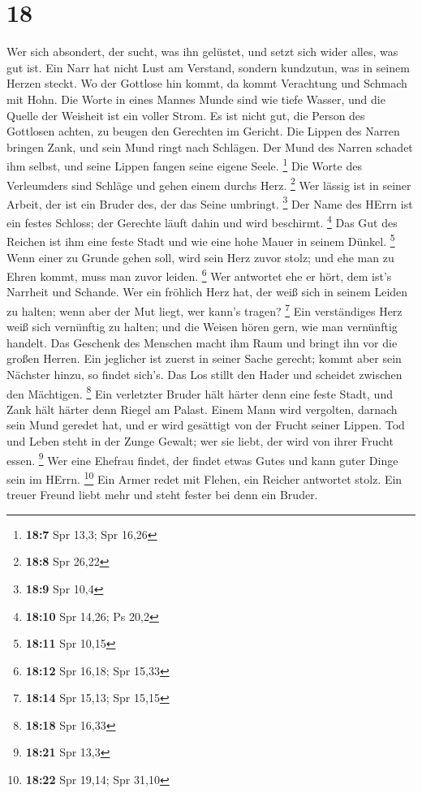 \hypertarget{section-17}{%
\section{18}\label{section-17}}

 Wer sich absondert, der sucht, was ihn gelüstet, und
setzt sich wider alles, was gut ist.  Ein Narr hat nicht
Lust am Verstand, sondern kundzutun, was in seinem Herzen steckt.
 Wo der Gottlose hin kommt, da kommt Verachtung und
Schmach mit Hohn.  Die Worte in eines Mannes Munde sind
wie tiefe Wasser, und die Quelle der Weisheit ist ein voller Strom.
 Es ist nicht gut, die Person des Gottlosen achten, zu
beugen den Gerechten im Gericht.  Die Lippen des Narren
bringen Zank, und sein Mund ringt nach Schlägen.  Der Mund
des Narren schadet ihm selbst, und seine Lippen fangen seine eigene
Seele. \footnote{\textbf{18:7} Spr 13,3; Spr 16,26}  Die
Worte des Verleumders sind Schläge und gehen einem durchs Herz.
\footnote{\textbf{18:8} Spr 26,22}  Wer lässig ist in
seiner Arbeit, der ist ein Bruder des, der das Seine umbringt.
\footnote{\textbf{18:9} Spr 10,4}  Der Name des HErrn ist
ein festes Schloss; der Gerechte läuft dahin und wird beschirmt.
\footnote{\textbf{18:10} Spr 14,26; Ps 20,2}  Das Gut des
Reichen ist ihm eine feste Stadt und wie eine hohe Mauer in seinem
Dünkel. \footnote{\textbf{18:11} Spr 10,15}  Wenn einer
zu Grunde gehen soll, wird sein Herz zuvor stolz; und ehe man zu Ehren
kommt, muss man zuvor leiden. \footnote{\textbf{18:12} Spr 16,18; Spr
  15,33}  Wer antwortet ehe er hört, dem ist's Narrheit
und Schande.  Wer ein fröhlich Herz hat, der weiß sich in
seinem Leiden zu halten; wenn aber der Mut liegt, wer kann's tragen?
\footnote{\textbf{18:14} Spr 15,13; Spr 15,15}  Ein
verständiges Herz weiß sich vernünftig zu halten; und die Weisen hören
gern, wie man vernünftig handelt.  Das Geschenk des
Menschen macht ihm Raum und bringt ihn vor die großen Herren.
 Ein jeglicher ist zuerst in seiner Sache gerecht; kommt
aber sein Nächster hinzu, so findet sich's.  Das Los
stillt den Hader und scheidet zwischen den Mächtigen. \footnote{\textbf{18:18}
  Spr 16,33}  Ein verletzter Bruder hält härter denn eine
feste Stadt, und Zank hält härter denn Riegel am Palast. 
Einem Mann wird vergolten, darnach sein Mund geredet hat, und er wird
gesättigt von der Frucht seiner Lippen.  Tod und Leben
steht in der Zunge Gewalt; wer sie liebt, der wird von ihrer Frucht
essen. \footnote{\textbf{18:21} Spr 13,3}  Wer eine
Ehefrau findet, der findet etwas Gutes und kann guter Dinge sein im
HErrn. \footnote{\textbf{18:22} Spr 19,14; Spr 31,10} 
Ein Armer redet mit Flehen, ein Reicher antwortet stolz. 
Ein treuer Freund liebt mehr und steht fester bei denn ein Bruder.

